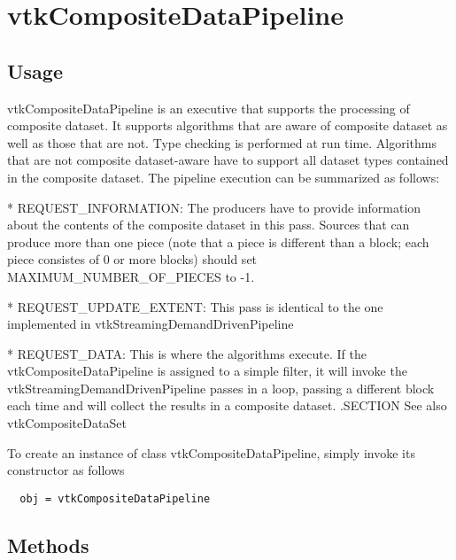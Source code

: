 \section{vtkCompositeDataPipeline}

\subsection{Usage}

 vtkCompositeDataPipeline is an executive that supports the processing of
 composite dataset. It supports algorithms that are aware of composite
 dataset as well as those that are not. Type checking is performed at run
 time. Algorithms that are not composite dataset-aware have to support
 all dataset types contained in the composite dataset. The pipeline
 execution can be summarized as follows: 

 * REQUEST\_INFORMATION: The producers have to provide information about
 the contents of the composite dataset in this pass. 
 Sources that can produce more than one piece (note that a piece is
 different than a block; each piece consistes of 0 or more blocks) should
 set MAXIMUM\_NUMBER\_OF\_PIECES to -1.

 * REQUEST\_UPDATE\_EXTENT: This pass is identical to the one implemented
 in vtkStreamingDemandDrivenPipeline

 * REQUEST\_DATA: This is where the algorithms execute. If the 
 vtkCompositeDataPipeline is assigned to a simple filter, 
 it will invoke the  vtkStreamingDemandDrivenPipeline passes in a loop, 
 passing a different block each time and will collect the results in a 
 composite dataset. 
 .SECTION See also
  vtkCompositeDataSet

To create an instance of class vtkCompositeDataPipeline, simply
invoke its constructor as follows
\begin{verbatim}
  obj = vtkCompositeDataPipeline
\end{verbatim}
\subsection{Methods}

